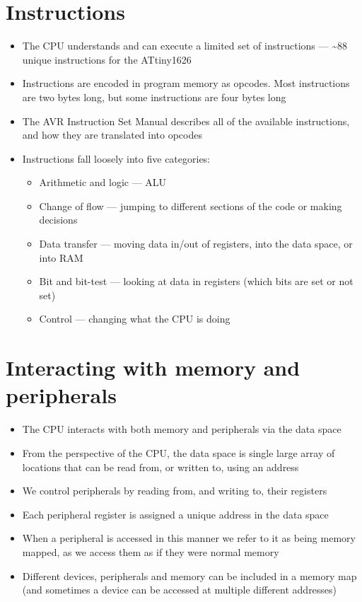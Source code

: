 \documentclass[a4paper]{report}
\begin{document}
\section{Instructions}
\begin{itemize}
    \item The CPU understands and can execute a limited set of instructions --- \textasciitilde88 unique instructions for the ATtiny1626
    \item Instructions are encoded in program memory as opcodes. Most instructions are two bytes long, but some instructions are four bytes long
    \item The AVR Instruction Set Manual describes all of the available instructions, and how they are translated into opcodes
    \item Instructions fall loosely into five categories:
          \begin{itemize}
              \item Arithmetic and logic --- ALU
              \item Change of flow --- jumping to different sections of the code or making decisions
              \item Data transfer --- moving data in/out of registers, into the data space, or into RAM
              \item Bit and bit-test --- looking at data in registers (which bits are set or not set)
              \item Control --- changing what the CPU is doing
          \end{itemize}
\end{itemize}
\section{Interacting with memory and peripherals}
\begin{itemize}
    \item The CPU interacts with both memory and peripherals via the data space
    \item From the perspective of the CPU, the data space is single large array of
          locations that can be read from, or written to, using an address
    \item We control peripherals by reading from, and writing to, their registers
    \item Each peripheral register is assigned a unique address in the data space
    \item When a peripheral is accessed in this manner we refer to it as being
          memory mapped, as we access them as if they were normal memory
    \item Different devices, peripherals and memory can be included in a memory map
          (and sometimes a device can be accessed at multiple different addresses)
\end{itemize}
\end{document}
